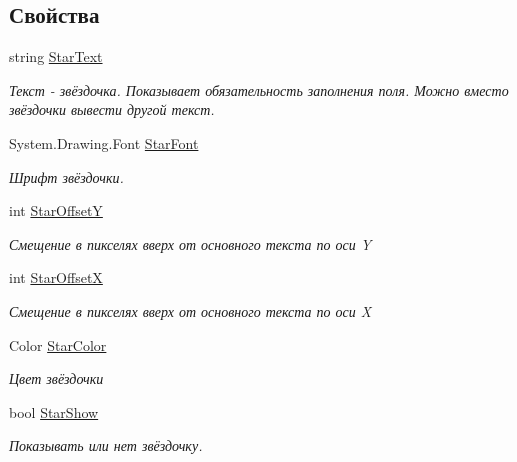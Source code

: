\subsection*{Свойства}
\begin{DoxyCompactItemize}
\item 
string \mbox{\hyperlink{class_f_b_a_1_1_label_f_b_a_a52cda6f76512f2cacf128cc4383dc787}{Star\+Text}}
\begin{DoxyCompactList}\small\item\em Текст -\/ звёздочка. Показывает обязательность заполнения поля. Можно вместо звёздочки вывести другой текст. \end{DoxyCompactList}\item 
System.\+Drawing.\+Font \mbox{\hyperlink{class_f_b_a_1_1_label_f_b_a_affffd8a611ddf73e90c71f192a1fa814}{Star\+Font}}
\begin{DoxyCompactList}\small\item\em Шрифт звёздочки. \end{DoxyCompactList}\item 
int \mbox{\hyperlink{class_f_b_a_1_1_label_f_b_a_a4387b900f2bcec9f26b2957810ebdbfa}{Star\+OffsetY}}
\begin{DoxyCompactList}\small\item\em Смещение в пикселях вверх от основного текста по оси Y \end{DoxyCompactList}\item 
int \mbox{\hyperlink{class_f_b_a_1_1_label_f_b_a_a902202d5498d9f446351a8d0ea94e4fe}{Star\+OffsetX}}
\begin{DoxyCompactList}\small\item\em Смещение в пикселях вверх от основного текста по оси X \end{DoxyCompactList}\item 
Color \mbox{\hyperlink{class_f_b_a_1_1_label_f_b_a_ae07b8e1265e663d8bc03148688d20157}{Star\+Color}}
\begin{DoxyCompactList}\small\item\em Цвет звёздочки \end{DoxyCompactList}\item 
bool \mbox{\hyperlink{class_f_b_a_1_1_label_f_b_a_a2bd5c9da08548f80ebe5d788b2a27248}{Star\+Show}}
\begin{DoxyCompactList}\small\item\em Показывать или нет звёздочку. \end{DoxyCompactList}\end{DoxyCompactItemize}


